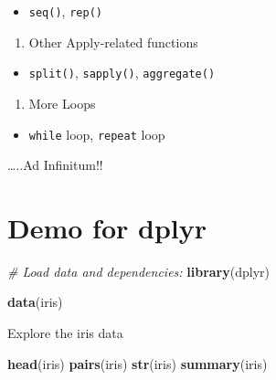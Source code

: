 \documentclass[]{book}
\newenvironment{Shaded}{\begin{snugshade}}{\end{snugshade}}
\newcommand{\CommentTok}[1]{\textcolor[rgb]{0.56,0.35,0.01}{\textit{#1}}}
\newcommand{\KeywordTok}[1]{\textcolor[rgb]{0.13,0.29,0.53}{\textbf{#1}}}
\newcommand{\NormalTok}[1]{#1}
\providecommand{\tightlist}{%
  \setlength{\itemsep}{0pt}\setlength{\parskip}{0pt}}
\begin{document}
\begin{itemize}
\tightlist
\item
  \texttt{seq()}, \texttt{rep()}
\end{itemize}

\begin{enumerate}
\def\labelenumi{\arabic{enumi}.}
\setcounter{enumi}{25}
\tightlist
\item
  Other Apply-related functions\\
\end{enumerate}

\begin{itemize}
\tightlist
\item
  \texttt{split()}, \texttt{sapply()}, \texttt{aggregate()}
\end{itemize}

\begin{enumerate}
\def\labelenumi{\arabic{enumi}.}
\setcounter{enumi}{26}
\tightlist
\item
  More Loops\\
\end{enumerate}

\begin{itemize}
\tightlist
\item
  \texttt{while} loop, \texttt{repeat} loop
\end{itemize}

\ldots{}..Ad Infinitum!!

\hypertarget{demo-for-dplyr}{%
\chapter{Demo for dplyr}\label{demo-for-dplyr}}

\begin{Shaded}
\begin{Highlighting}[]
\CommentTok{# Load data and dependencies:}
\KeywordTok{library}\NormalTok{(dplyr)}

\KeywordTok{data}\NormalTok{(iris)}
\end{Highlighting}
\end{Shaded}

Explore the iris data

\begin{Shaded}
\begin{Highlighting}[]
\KeywordTok{head}\NormalTok{(iris)}
\KeywordTok{pairs}\NormalTok{(iris)}
\KeywordTok{str}\NormalTok{(iris)}
\KeywordTok{summary}\NormalTok{(iris)}
\end{Highlighting}
\end{Shaded}
\end{document}
